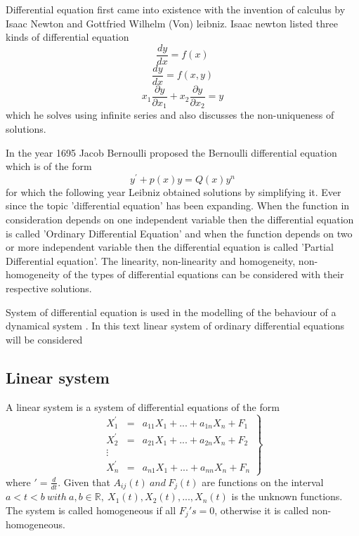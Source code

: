 \documentclass[a4paper,12pt]{report}
\numberwithin{equation}{section}
\begin{document}
Differential equation first came into existence with the invention of calculus by Isaac Newton and Gottfried Wilhelm (Von) leibniz. Isaac newton listed three kinds of differential equation
\begin{equation*}
\frac{dy}{dx}=f(x)
\end{equation*} 
\begin{equation*}
\frac{dy}{dx}=f(x,y)
\end{equation*}
\begin{equation*}
x_1\frac{\partial y}{\partial x_1}+ x_2\frac{\partial y}{\partial x_2}=y
\end{equation*}
which he solves using infinite series and also discusses the non-uniqueness of solutions.

In the year 1695 Jacob Bernoulli proposed the Bernoulli differential equation which is of the form
\begin{equation*}
y^\prime+p(x)y=Q(x)y^n
\end{equation*}
for which the following year Leibniz obtained solutions by simplifying it. Ever since the topic 'differential equation' has been expanding. When the function in consideration depends on one independent variable then the differential equation is called 'Ordinary Differential Equation' and when the function depends on two or more independent variable then the differential equation is called 'Partial Differential equation'. The linearity, non-linearity and homogeneity, non-homogeneity of the types of differential equations can be considered with their respective solutions.

System of differential equation is used in the modelling of the behaviour of a dynamical system . In this text linear system of ordinary differential equations will be considered
\subsection*{Linear system} A linear system is a system of differential equations of the form 
\begin{equation} \left.
\begin{array}{lllll}
X_{1}^\prime &=& a_{11}X_{1}+ ...+ a_{1n}X_{n}+F_{1} \\
X_{2}^\prime &=& a_{21}X_{1}+ ...+ a_{2n}X_{n}+F_{2}\\
\vdots \\
X_{n}^\prime &=& a_{n1}X_{1}+ ...+ a_{nn}X_{n}+F_{n}
\end{array} \right\}
\end{equation}
where $ \prime = \frac{d}{dt} $.
Given that $ A_{ij}(t) \ and \ F_{j}(t) $
are functions on the interval $ a<t<b \ with \ a,b \in \mathbb{R}, \ X_{1}(t),X_{2}(t),...,X_{n}(t) $ is the unknown functions.\\
The system is called homogeneous if all $ F_{j} ' s = 0 $, otherwise it is called non-homogeneous.
\end{document}

